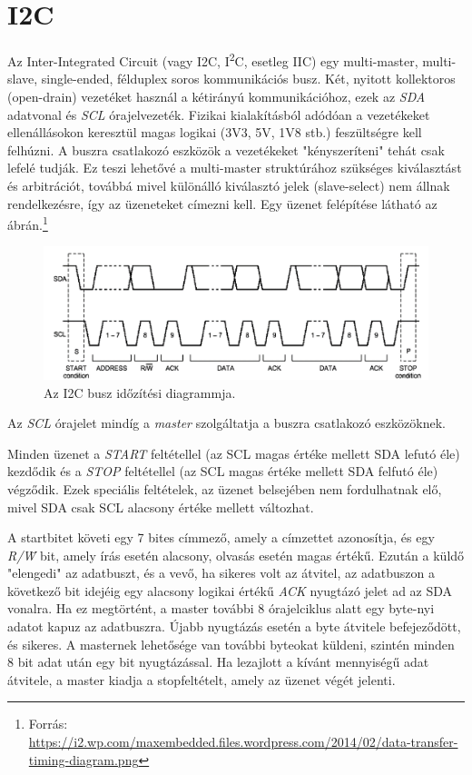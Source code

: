 \section{I2C} {
    Az Inter-Integrated Circuit (vagy I2C, I\textsuperscript{2}C, esetleg IIC) egy multi-master, multi-slave, single-ended, félduplex soros kommunikációs busz.\cite{I2C}
    Két, nyitott kollektoros (open-drain) vezetéket használ a kétirányú kommunikációhoz, ezek az \emph{SDA} adatvonal és \emph{SCL} órajelvezeték. Fizikai kialakításból adódóan a vezetékeket ellenállásokon keresztül magas logikai (3V3, 5V, 1V8 stb.) feszültségre kell felhúzni. A buszra csatlakozó eszközök a vezetékeket "kényszeríteni" tehát csak lefelé tudják. Ez teszi lehetővé a multi-master struktúrához szükséges kiválasztást és arbitrációt, továbbá mivel különálló kiválasztó jelek (slave-select) nem állnak rendelkezésre, így az üzeneteket címezni kell. Egy üzenet felépítése látható az  ábrán.\footnote{Forrás: \tiny\\\url{https://i2.wp.com/maxembedded.files.wordpress.com/2014/02/data-transfer-timing-diagram.png}}

    \begin{figure}[ht!]
        \includegraphics[width = \textwidth]{figures/i2ctiming}
        \caption{Az I2C busz időzítési diagrammja.}
        \label{fig:I2Cmessage}
    \end{figure}

    Az \emph{SCL} órajelet mindíg a \emph{master} szolgáltatja a buszra csatlakozó eszközöknek.

    Minden üzenet a \emph{START} feltétellel (az SCL magas értéke mellett SDA lefutó éle) kezdődik és a \emph{STOP} feltétellel (az SCL magas értéke mellett SDA felfutó éle) végződik. Ezek speciális feltételek, az üzenet belsejében nem fordulhatnak elő, mivel SDA csak SCL alacsony értéke mellett változhat.

    A startbitet követi egy 7 bites címmező, amely a címzettet azonosítja, és egy \emph{R/\={W}} bit, amely írás esetén alacsony, olvasás esetén magas értékű. Ezután a küldő "elengedi" az adatbuszt, és a vevő, ha sikeres volt az átvitel, az adatbuszon a következő bit idejéig egy alacsony logikai értékű \emph{ACK} nyugtázó jelet ad az SDA vonalra. Ha ez megtörtént, a master további 8 órajelciklus alatt egy byte-nyi adatot kapuz az adatbuszra. Újabb nyugtázás esetén a byte átvitele befejeződött, és sikeres. A masternek lehetősége van további byteokat küldeni, szintén minden 8 bit adat után egy bit nyugtázással. Ha lezajlott a kívánt mennyiségű adat átvitele, a master kiadja a stopfeltételt, amely az üzenet végét jelenti.
}
